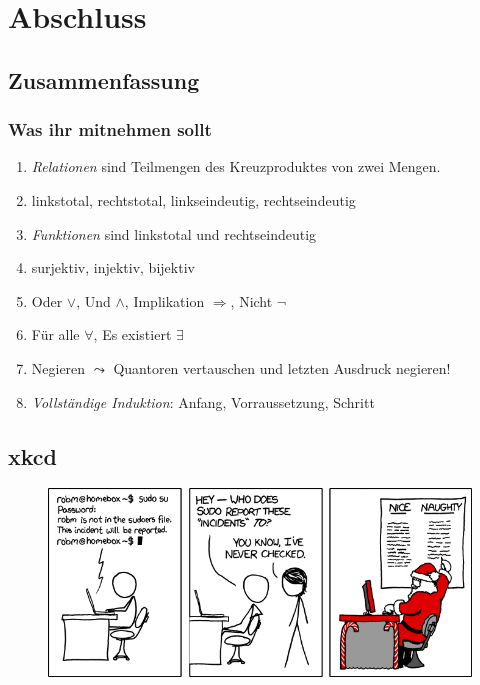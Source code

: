 \documentclass{beamer}
\begin{document}





\section{Abschluss}
\subsection{Zusammenfassung}
\begin{frame}
  \frametitle{Was ihr mitnehmen sollt}
  \begin{enumerate}
    \item \emph{Relationen} sind Teilmengen des Kreuzproduktes von zwei Mengen.
    \item linkstotal, rechtstotal, linkseindeutig, rechtseindeutig
    \item \emph{Funktionen} sind linkstotal und rechtseindeutig
    \item surjektiv, injektiv, bijektiv
    \item Oder $\vee$, Und $\wedge$, Implikation $\Rightarrow$, Nicht $\neg$
    \item Für alle $\forall$, Es existiert $\exists$
    \item Negieren $\leadsto$ Quantoren vertauschen und letzten Ausdruck negieren!
    \item \emph{Vollständige Induktion}: Anfang, Vorraussetzung, Schritt
   \end{enumerate}
\end{frame}

\subsection{xkcd}
\begin{frame}[plain]
  \begin{figure}
    \begin{center}
      \includegraphics[width=320pt]{incident}
    \end{center}
  \end{figure}
\end{frame}
\end{document}
